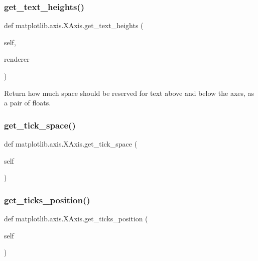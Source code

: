 \subsubsection{\texorpdfstring{get\+\_\+text\+\_\+heights()}{get\_text\_heights()}}
{\footnotesize\ttfamily def matplotlib.\+axis.\+X\+Axis.\+get\+\_\+text\+\_\+heights (\begin{DoxyParamCaption}\item[{}]{self,  }\item[{}]{renderer }\end{DoxyParamCaption})}

\begin{DoxyVerb}Return how much space should be reserved for text above and below the
axes, as a pair of floats.
\end{DoxyVerb}
 \mbox{\label{classmatplotlib_1_1axis_1_1XAxis_a34cc7f0e350ec06f2318c8d3f18e6f51}} 
\subsubsection{\texorpdfstring{get\+\_\+tick\+\_\+space()}{get\_tick\_space()}}
{\footnotesize\ttfamily def matplotlib.\+axis.\+X\+Axis.\+get\+\_\+tick\+\_\+space (\begin{DoxyParamCaption}\item[{}]{self }\end{DoxyParamCaption})}

\mbox{\label{classmatplotlib_1_1axis_1_1XAxis_af84ec2de6ad935cd33ba19feb79261ef}} 
\subsubsection{\texorpdfstring{get\+\_\+ticks\+\_\+position()}{get\_ticks\_position()}}
{\footnotesize\ttfamily def matplotlib.\+axis.\+X\+Axis.\+get\+\_\+ticks\+\_\+position (\begin{DoxyParamCaption}\item[{}]{self }\end{DoxyParamCaption})}

